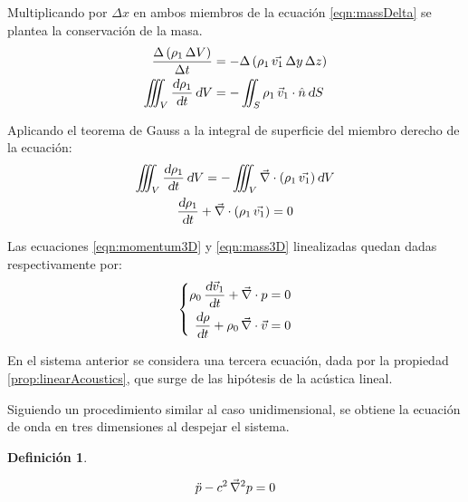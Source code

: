 \documentclass[a5paper,12pt,twoside]{book}
\newtheorem{defn}{{Definición}}[chapter]
\begin{document}

Multiplicando por $\Delta x$ en ambos miembros de la ecuación \ref{eqn:massDelta} se plantea la conservación de la masa.
\begin{align*}
    \frac{\Delta \left( \rho_1 \, \Delta V \right)}{\Delta t}
    &=
    -\Delta \left( \rho_1 \, \Vec{v_1} \, \Delta y \, \Delta z \right)
    \\
    \iiint_V \frac{\textsl{d} \rho_1}{\textsl{d} t} \, \textsl{d} V
    &=
    - \iint_S \rho_1 \, \Vec{v}_1 \cdot \hat{n} \, \textsl{d} S
\end{align*}

Aplicando el teorema de Gauss a la integral de superficie del miembro derecho de la ecuación:
\begin{gather}
    \iiint_V \frac{\textsl{d} \rho_1}{\textsl{d} t} \, \textsl{d} V
    =
    - \iiint_V \Vec{\nabla} \cdot \left( \rho_1 \, \Vec{v_1} \right) \textsl{d} V
    \notag\\
    \frac{\textsl{d} \rho_1}{\textsl{d} t} + \Vec{\nabla} \cdot \left( \rho_1 \, \Vec{v_1} \right) = 0
    \label{eqn:mass3D}
\end{gather}

Las ecuaciones \ref{eqn:momentum3D} y \ref{eqn:mass3D} linealizadas quedan dadas respectivamente por:
\begin{equation*}
    \left\{
    \begin{aligned}
        \rho_0 \, \frac{\textsl{d} \Vec{v}_1}{\textsl{d} t} + \Vec{\nabla} \cdot p &= 0
        \\
        \frac{\textsl{d} \rho}{\textsl{d} t} + \rho_0 \, \Vec{\nabla} \cdot \Vec{v} &= 0
    \end{aligned}
    \right.
\end{equation*}

En el sistema anterior se considera una tercera ecuación, dada por la propiedad \ref{prop:linearAcoustics}, que surge de las hipótesis de la acústica lineal.

Siguiendo un procedimiento similar al caso unidimensional, se obtiene la ecuación de onda en tres dimensiones al despejar el sistema.

\begin{mdframed}[style=MyFrame1]
    \begin{defn}
        \label{defn:soundWave3D}
    \end{defn}
    \begin{equation*}
        \ddot{p} - c^2 \, \Vec{\nabla}^2 p = 0
    \end{equation*}
\end{mdframed}
\end{document}
